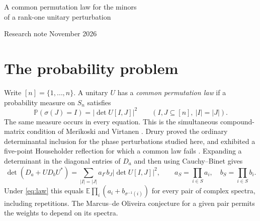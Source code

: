 \documentclass[11pt]{article}
\newcommand{\Prb}{\mathbb P}
\begin{document}
\begin{center}
{\LARGE A common permutation law for the minors\\[3pt] of a rank-one unitary perturbation\par}
\vspace{8pt}
{\small Research note  November 2026}
\end{center}
\begin{abstract}
For a unitary matrix acting by a phase on a line and by the identity on its orthogonal complement, we characterize the existence of a random permutation whose set images simultaneously realize the squared moduli of every minor. In dimension five the criterion is a single fourth-moment inequality. In all dimensions the minimum required mass on nonidentity permutations is the maximum of explicit quadratic functions indexed by signed set partitions. The proof constructs an optimizer by induction and a probability law by fractional triangle packing. We give a six-dimensional obstruction invisible to the expected number of moved points and explain its relation to a classical triangle-decomposition inequality.
\end{abstract}

\section{The probability problem}
Write $[n]=\{1,\ldots,n\}$. A unitary $U$ has a \emph{common permutation law} if a probability measure on $S_n$ satisfies
\begin{equation}\label{eq:law}
  \Prb(\sigma(J)=I)=|\det U[I,J]|^2
  \qquad (I,J\subseteq[n],\ |I|=|J|).
\end{equation}
The same measure occurs in every equation. This is the simultaneous compound-matrix condition of Merikoski and Virtanen \cite{MV}. Drury proved the ordinary determinantal inclusion for the phase perturbations studied here, and exhibited a five-point Householder reflection for which a common law fails \cite[Corollary 4 and section 3]{Drury}. Expanding a determinant in the diagonal entries of $D_a$ and then using Cauchy--Binet gives
\[
 \det(D_a+U D_b U^*)=
 \sum_{|I|=|J|} a_{I^c} b_J |\det U[I,J]|^2,
 \qquad a_S=\prod_{i\in S}a_i,\quad b_S=\prod_{i\in S}b_i .
\]
Under \eqref{eq:law} this equals $\mathbb E\prod_i(a_i+b_{\sigma^{-1}(i)})$ for every pair of complex spectra, including repetitions. The Marcus--de Oliveira conjecture for a given pair permits the weights to depend on its spectra.
\end{document}
